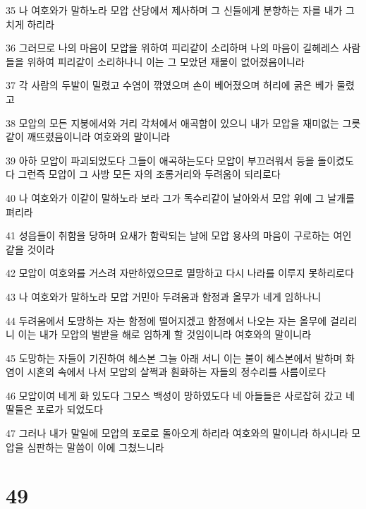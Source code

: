 \par 35 나 여호와가 말하노라 모압 산당에서 제사하며 그 신들에게 분향하는 자를 내가 그치게 하리라
\par 36 그러므로 나의 마음이 모압을 위하여 피리같이 소리하며 나의 마음이 길헤레스 사람들을 위하여 피리같이 소리하나니 이는 그 모았던 재물이 없어졌음이니라
\par 37 각 사람의 두발이 밀렸고 수염이 깎였으며 손이 베어졌으며 허리에 굵은 베가 둘렸고
\par 38 모압의 모든 지붕에서와 거리 각처에서 애곡함이 있으니 내가 모압을 재미없는 그릇같이 깨뜨렸음이니라 여호와의 말이니라
\par 39 아하 모압이 파괴되었도다 그들이 애곡하는도다 모압이 부끄러워서 등을 돌이켰도다 그런즉 모압이 그 사방 모든 자의 조롱거리와 두려움이 되리로다
\par 40 나 여호와가 이같이 말하노라 보라 그가 독수리같이 날아와서 모압 위에 그 날개를 펴리라
\par 41 성읍들이 취함을 당하며 요새가 함락되는 날에 모압 용사의 마음이 구로하는 여인 같을 것이라
\par 42 모압이 여호와를 거스려 자만하였으므로 멸망하고 다시 나라를 이루지 못하리로다
\par 43 나 여호와가 말하노라 모압 거민아 두려움과 함정과 올무가 네게 임하나니
\par 44 두려움에서 도망하는 자는 함정에 떨어지겠고 함정에서 나오는 자는 올무에 걸리리니 이는 내가 모압의 벌받을 해로 임하게 할 것임이니라 여호와의 말이니라
\par 45 도망하는 자들이 기진하여 헤스본 그늘 아래 서니 이는 불이 헤스본에서 발하며 화염이 시혼의 속에서 나서 모압의 살쩍과 훤화하는 자들의 정수리를 사름이로다
\par 46 모압이여 네게 화 있도다 그모스 백성이 망하였도다 네 아들들은 사로잡혀 갔고 네 딸들은 포로가 되었도다
\par 47 그러나 내가 말일에 모압의 포로로 돌아오게 하리라 여호와의 말이니라 하시니라 모압을 심판하는 말씀이 이에 그쳤느니라

\chapter{49}

